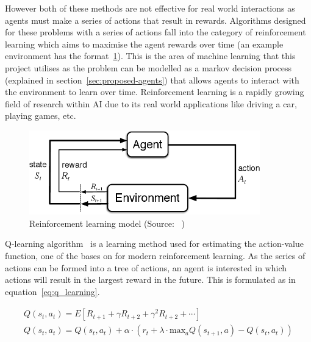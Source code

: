 However both of these methods are not effective for real world interactions as agents must make a series of
actions that result in rewards. Algorithms designed for these problems with a series of actions fall into the category
of reinforcement learning which aims to maximise the agent rewards over time (an example environment has the
format~\ref{fig:reinforcement_learning}). This is the area of machine learning that this
project utilises as the problem can be modelled as a markov decision process (explained in section~\ref{sec:proposed-agents})
that allows agents to interact with the environment to learn over time. Reinforcement learning is a rapidly growing
field of research within AI due to its real world applications like driving a car, playing games, etc.

\begin{figure}
    \includegraphics[width=10cm]{figures/reinforcement_learning.png}
    \caption{Reinforcement learning model (Source: ~\cite{Sutton1998})}
    \label{fig:reinforcement_learning}
\end{figure}

Q-learning algorithm~\cite{watkins1992q-learning} is a learning method used for estimating the action-value function,
one of the bases on for modern reinforcement learning. As the series of actions can be formed into a tree of
actions, an agent is interested in which actions will result in the largest reward in the future. This is formulated
as in equation~\eqref{eq:q_learning}.

\begin{align}
    Q(s_t, a_t) = E[R_{t+1} + \gamma R_{t+2} + \gamma^2 R_{t+2} + \cdots ] \label{eq:q_value} \\
    Q(s_t, a_t) = Q(s_t, a_t) + \alpha \cdot (r_t + \lambda \cdot \text{max}_a Q(s_{t+1} , a) - Q(s_t, a_t) ) \label{eq:q_learning} \\
\end{align}

